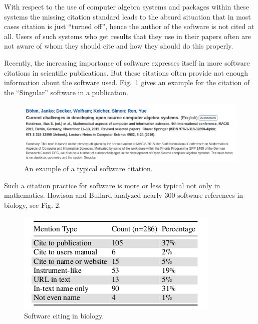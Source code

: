 \documentclass[12pt]{article}
\begin{document}
With respect to the use of computer algebra systems and packages within these
systems the missing citation standard leads to the absurd situation that in
most cases citation is just ``turned off'', hence the author of the software is
not cited at all. Users of such systems who get results that they use in their
papers often are not aware of whom they should cite and how they should do this
properly.

Recently, the increasing importance of software expresses itself in more
software citations in scientific publications. But these citations often
provide not enough information about the software used.  Fig.~1 gives an
example for the citation of the ``Singular'' software in a publication.

\begin{figure}[h]
 \centering
 \includegraphics[scale=0.15]{aca1}
 \caption{An example of a typical software citation.\label{abb_1}}
\end{figure}

Such a citation practice for software is more or less typical not only in
mathematics. Howison and Bullard \cite{Howison&Bullard2015} analyzed nearly 300
software references in biology, see Fig. 2.

\begin{figure}[h]
 \centering
 \includegraphics[scale=0.15]{aca2}
 \caption{Software citing in biology.\label{abb_2}}
\end{figure}
\end{document}
